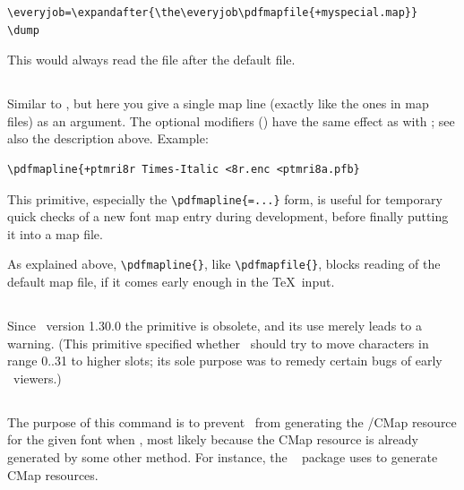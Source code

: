 \documentclass{pdftexmanual}
\begin{document}
\begin{verbatim}
\everyjob=\expandafter{\the\everyjob\pdfmapfile{+myspecial.map}}
\dump
\end{verbatim}

This would always read the file  after the default
 file.

\subsection{}

Similar to , but here you give a single map line (exactly
like the ones in map files) as an argument. The optional modifiers
(\type{+-=}) have the same effect as with ; see also the
description above. Example:

\begin{verbatim}
\pdfmapline{+ptmri8r Times-Italic <8r.enc <ptmri8a.pfb}
\end{verbatim}

This primitive, especially the \verb|\pdfmapline{=...}| form, is useful
for temporary quick checks of a new font map entry during development,
before finally putting it into a map file.

As explained above, \verb|\pdfmapline{}|, like \verb|\pdfmapfile{}|,
blocks reading of the default map file, if it comes early enough in the
\TeX\ input. 

\subsection{}

Since \PDFTEX\ version 1.30.0 the primitive  is
obsolete, and its use merely leads to a warning. (This primitive
specified whether \PDFTEX\ should try to move characters in range 0..31
to higher slots; its sole purpose was to remedy certain bugs of early
\PDF\ viewers.)

\subsection{}

The purpose of this command is to prevent \PDFTEX\ from generating the
/CMap resource for the given font when
, most likely because the CMap resource is already
generated by some other method. For instance, the \LATEX\ 
package uses  to generate CMap resources.
\end{document}

